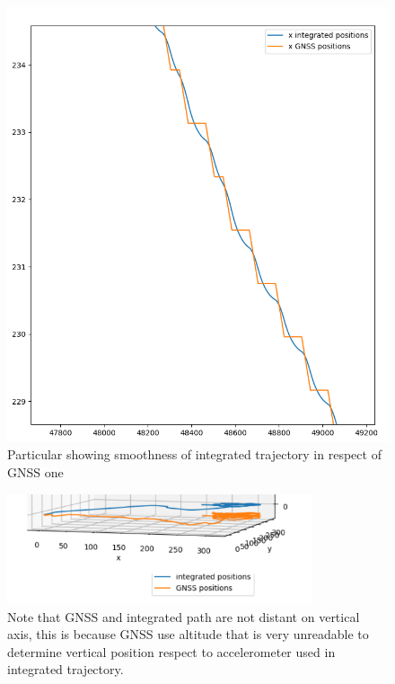 \begin{figure}[H]
\centering
\includegraphics[width=\textwidth/2]{smooth.png}
\caption{Particular showing smoothness of integrated trajectory in respect of GNSS one}
\end{figure}

\begin{figure}[H]
\centering
\includegraphics[width=0.8\textwidth]{parking_3d_z_different.png}
\caption{Note that GNSS and integrated path are not distant on vertical axis, this is because GNSS use altitude that is very unreadable to determine vertical position respect to accelerometer used in integrated trajectory.}
\end{figure}


